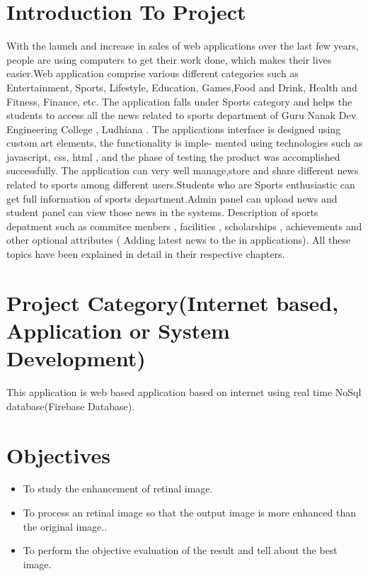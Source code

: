 \section{Introduction To Project} 
With the launch and increase in sales of web applications over the last few years, people are using
computers to get their work done, which makes their lives easier.Web application comprise various different categories such as Entertainment, Sports, Lifestyle, Education,
Games,Food and Drink, Health and Fitness, Finance, etc. The application falls under Sports
category and helps the students to access all the news related to sports department of Guru
Nanak Dev Engineering College , Ludhiana .
The applications interface is designed using custom art elements, the functionality is imple-
mented using technologies such as javascript, css, html , and the phase of testing the product was accomplished successfully. The application can very well manage,store and share different news related to sports
among different users.Students who are Sports enthusiastic can get full information of sports
department.Admin panel can upload news and student panel can view those news in the systems. Description of sports depatment such as commitee menbers , facilities , scholarships ,
achievements and other optional attributes ( Adding latest news to the in applications). All
these topics have been explained in detail in their respective chapters.

\section{Project Category(Internet based, Application or System Development)}
This application is web based application based on internet using real time NoSql database(Firebase Database).

\section{Objectives}

\begin{itemize}
	\item  To study the enhancement of retinal image.

	\item To process an retinal image so that the output image is more enhanced than the original image..
	
	\item To perform the objective evaluation of the result and tell about the best image.


\end{itemize}

